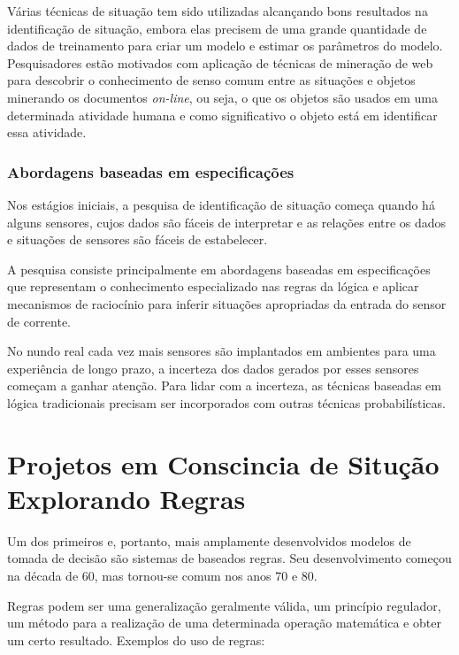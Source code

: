 \documentclass[12pt,a4paper,compsoc]{IEEEtran}
\begin{document}
  Várias técnicas de situação tem sido utilizadas alcançando bons resultados na identificação de
  situação, embora elas precisem de uma grande quantidade de dados de treinamento para criar um
  modelo e estimar os parâmetros do modelo. Pesquisadores estão motivados com aplicação de técnicas
  de mineração de web para descobrir o conhecimento de senso comum entre as situações e objetos
  minerando os documentos \textit{on-line}, ou seja, o que os objetos são usados em uma determinada 
  atividade humana e como significativo o objeto está em identificar essa atividade.


\subsubsection{Abordagens baseadas em especificações}

  Nos estágios iniciais, a pesquisa de identificação de situação começa quando há alguns sensores,
  cujos dados são fáceis de interpretar e as relações entre os dados e situações de sensores são 
  fáceis de estabelecer.
  
  A pesquisa consiste principalmente em abordagens baseadas em especificações que representam o
  conhecimento especializado nas regras da lógica e aplicar mecanismos de raciocínio para inferir
  situações apropriadas da entrada do sensor de corrente.
  
  No nundo real cada vez mais sensores são implantados em ambientes para uma experiência de longo
  prazo, a incerteza dos dados gerados por esses sensores  começam a ganhar atenção. Para lidar com
  a incerteza, as técnicas baseadas em lógica tradicionais precisam ser incorporados com outras
  técnicas probabilísticas.


\section{Projetos em Conscincia de Situção Explorando Regras}

  Um dos primeiros e, portanto, mais amplamente desenvolvidos modelos de tomada de decisão são
  sistemas de baseados regras. Seu  desenvolvimento começou na década de 60, mas tornou-se comum
  nos anos 70 e 80.
  
  Regras podem ser  uma generalização geralmente válida, um princípio regulador, um método para a
  realização de uma determinada operação matemática e obter um certo resultado. Exemplos do uso de
  regras:
  
\end{document}
